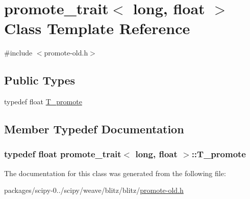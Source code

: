 \hypertarget{classpromote__trait_3_01long_00_01float_01_4}{}\section{promote\+\_\+trait$<$ long, float $>$ Class Template Reference}
\label{classpromote__trait_3_01long_00_01float_01_4}


{\ttfamily \#include $<$promote-\/old.\+h$>$}

\subsection*{Public Types}
\begin{DoxyCompactItemize}
\item 
typedef float \hyperlink{classpromote__trait_3_01long_00_01float_01_4_a48f80dd08cbe9a3cb02ce66f4d55ec62}{T\+\_\+promote}
\end{DoxyCompactItemize}


\subsection{Member Typedef Documentation}
\hypertarget{classpromote__trait_3_01long_00_01float_01_4_a48f80dd08cbe9a3cb02ce66f4d55ec62}{}
\subsubsection[{T\+\_\+promote}]{\setlength{\rightskip}{0pt plus 5cm}typedef float {\bf promote\+\_\+trait}$<$ long, float $>$\+::{\bf T\+\_\+promote}}\label{classpromote__trait_3_01long_00_01float_01_4_a48f80dd08cbe9a3cb02ce66f4d55ec62}


The documentation for this class was generated from the following file\+:\begin{DoxyCompactItemize}
\item 
packages/scipy-\/0../scipy/weave/blitz/blitz/\hyperlink{promote-old_8h}{promote-\/old.\+h}\end{DoxyCompactItemize}
